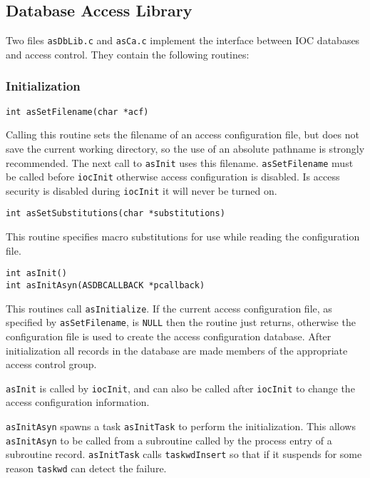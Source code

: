 \subsection{Database Access Library}

Two files \verb|asDbLib.c| and \verb|asCa.c| implement the interface between IOC databases and access control.
They contain the following routines:

\subsubsection{Initialization}

\begin{verbatim}
int asSetFilename(char *acf)
\end{verbatim}

Calling this routine sets the filename of an access configuration file, but does not save the current working directory, so the use of an absolute pathname is strongly recommended.
The next call to \verb|asInit| uses this filename.
\verb|asSetFilename| must be called before \verb|iocInit| otherwise access configuration is disabled.
Is access security is disabled during \verb|iocInit| it will never be turned on.

\begin{verbatim}
int asSetSubstitutions(char *substitutions)
\end{verbatim}

This routine specifies macro substitutions for use while reading the configuration file.

\begin{verbatim}
int asInit()
int asInitAsyn(ASDBCALLBACK *pcallback)
\end{verbatim}

This routines call \verb|asInitialize|.
If the current access configuration file, as specified by \verb|asSetFilename|, is \verb|NULL| then the routine just returns, otherwise the configuration file is used to create the access configuration database.
After initialization all records in the database are made members of the appropriate access control group.

\verb|asInit| is called by \verb|iocInit|, and can also be called after \verb|iocInit| to change the access configuration information.

\verb|asInitAsyn| spawns a task \verb|asInitTask| to perform the initialization.
This allows \verb|asInitAsyn| to be called from a subroutine called by the process entry of a subroutine record. \verb|asInitTask| calls \verb|taskwdInsert| so that if it suspends for some reason \verb|taskwd| can detect the failure.

